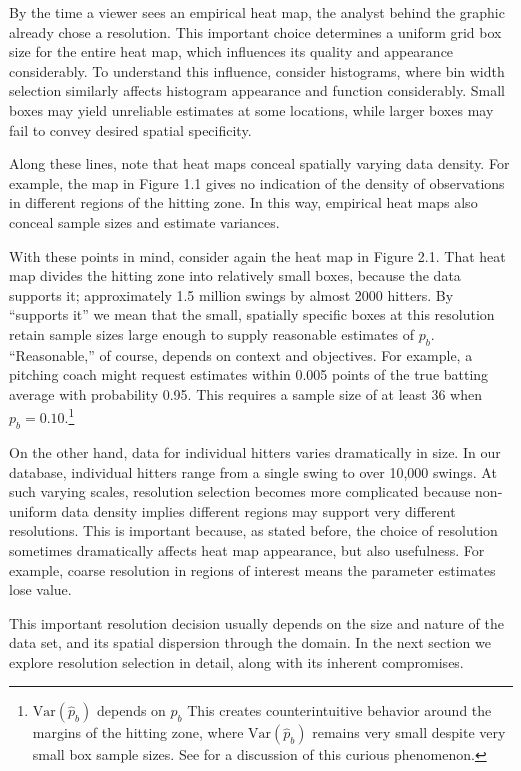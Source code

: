 By the time a viewer sees an empirical heat map, the analyst behind the graphic already chose a resolution. This important choice determines a uniform grid box size for the entire heat map, which influences its quality and appearance considerably. To understand this influence, consider histograms, where bin width selection similarly affects histogram appearance and function considerably. Small boxes may yield unreliable estimates at some locations, while larger boxes may fail to convey desired spatial specificity. 

Along these lines, note that heat maps conceal spatially varying data density. For example, the map in Figure 1.1 gives no indication of the density of observations in different regions of the hitting zone. In this way, empirical heat maps also conceal sample sizes and estimate variances.  

With these points in mind, consider again the heat map in Figure 2.1. That heat map divides the hitting zone into relatively small boxes, because the data supports it; approximately 1.5 million swings by almost 2000 hitters. By ``supports it'' we mean that the small, spatially specific boxes at this resolution retain sample sizes large enough to supply reasonable estimates of $p_{b}$. ``Reasonable,'' of course, depends on context and objectives. For example, a pitching coach might request estimates within 0.005 points of the true batting average with probability 0.95. This requires a sample size of at least 36 when $p_{b} = 0.10$.\footnote{$\text{Var}(\hat{p}_{b})$ depends on $p_{b}$ This creates counterintuitive behavior around the margins of the hitting zone, where $\text{Var}(\hat{p}_{b})$ remains very small despite very small box sample sizes. See \cite{Dixon2005} for a discussion of this curious phenomenon.}

On the other hand, data for individual hitters varies dramatically in size. In our database, individual hitters range from a single swing to over 10,000 swings. At such varying scales, resolution selection becomes more complicated because non-uniform data density implies different regions may support very different resolutions. This is important because, as stated before, the choice of resolution sometimes dramatically affects heat map appearance, but also usefulness. For example, coarse resolution in regions of interest means the parameter estimates lose value. 

This important resolution decision usually depends on the size and nature of the data set, and its spatial dispersion through the domain. In the next section we explore resolution selection in detail, along with its inherent compromises.

